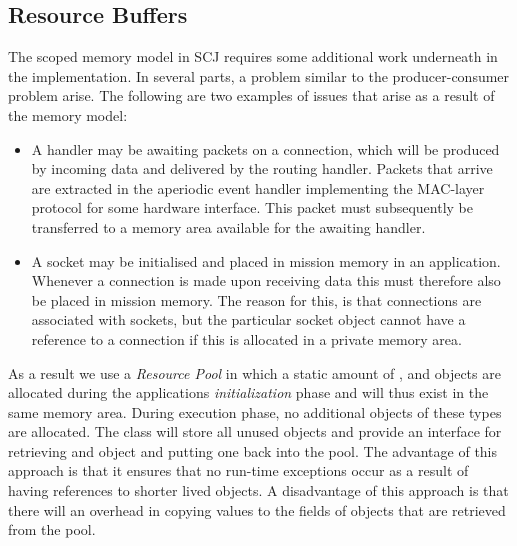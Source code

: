 \subsection{Resource Buffers}
The scoped memory model in SCJ requires some additional work underneath in the implementation. In several parts, a problem similar to the producer-consumer problem arise. The following are two examples of issues that arise as a result of the memory model:
\begin{itemize}
	\item A handler may be awaiting packets on a connection, which will be produced by incoming data and delivered by the routing handler. Packets that arrive are extracted in the aperiodic event handler implementing the MAC-layer protocol for some hardware interface. This packet must subsequently be transferred to a memory area available for the awaiting handler.
	\item A socket may be initialised and placed in mission memory in an application. Whenever a connection is made upon receiving data this must therefore also be placed in mission memory. The reason for this, is that connections are associated with sockets, but the particular socket object cannot have a reference to a connection if this is allocated in a private memory area.
\end{itemize}

As a result we use a \textit{Resource Pool}\cite{Rios:2012:PSJ:2388936.2388938} in which a static amount of ,  and  objects are allocated during the applications \textit{initialization} phase and will thus exist in the same memory area. During execution phase, no additional objects of these types are allocated. The class  will store all unused objects and provide an interface for retrieving and object and putting one back into the pool. The advantage of this approach is that it ensures that no run-time exceptions occur as a result of having references to shorter lived objects. A disadvantage of this approach is that there will an overhead in copying values to the fields of objects that are retrieved from the pool. 